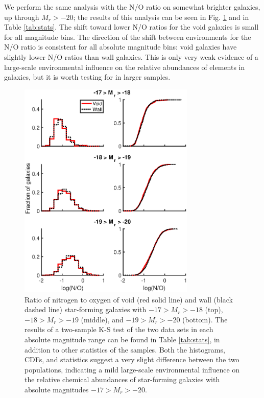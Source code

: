 We perform the same analysis with the N/O ratio on somewhat brighter galaxies, 
up through $M_r > -20$; the results of this analysis can be seen in Fig. 
\ref{fig:NO_bright} and in Table \ref{tab:stats}.  The shift toward lower N/O 
ratios for the void galaxies is small for all magnitude bins.  The direction of 
the shift between environments for the N/O ratio is consistent for all absolute 
magnitude bins: void galaxies have slightly lower N/O ratios than wall galaxies.  
This is only very weak evidence of a large-scale environmental influence on the 
relative abundances of elements in galaxies, but it is worth testing for in 
larger samples.

\begin{figure}
    \centering
    \includegraphics[width=0.75\textwidth]{Images/Paper2/1sig_17-20_SF_t3_logNO_stacked}
    \caption[N/O distribution of star-forming galaxies with $-17 > M_r > -20$]
    {Ratio of nitrogen to oxygen of void (red solid line) and wall (black dashed 
    line) star-forming galaxies with $-17 > M_r > -18$ (top), $-18 > M_r > -19$ 
    (middle), and $-19 > M_r > -20$ (bottom).  The results of a two-sample K-S 
    test of the two data sets in each absolute magnitude range can be found in 
    Table \ref{tab:stats}, in addition to other statistics of the samples.  Both 
    the histograms, CDFs, and statistics suggest a very slight difference 
    between the two populations, indicating a mild large-scale environmental 
    influence on the relative chemical abundances of star-forming galaxies with 
    absolute magnitudes $-17 > M_r > -20$.}
    \label{fig:NO_bright}
\end{figure}

